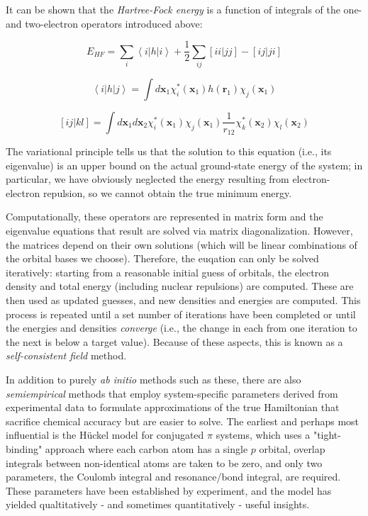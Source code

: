 \documentclass[12pt,letter,footinclude=true,headinclude=true,hyphens]{book} %
\begin{document}
    It can be shown that the \emph{Hartree-Fock energy} is a function of integrals of the one- and two-electron operators introduced above:
    
    \begin{equation}
    E_{HF} = \sum_i \left < i | h | i \right > + \frac{1}{2} \sum_{ij} \left [ ii | jj \right ] - \left [ ij | ji \right ]
    \end{equation}
    
    \begin{equation}
    \left < i | h | j \right > = \int d\mathbf{x}_1 \chi_i^* (\mathbf{x}_1)  h(\mathbf{r}_1) \chi_j (\mathbf{x}_1)
    \end{equation}
    
    \begin{equation}
    \left [ ij | kl \right ] = \int d\mathbf{x}_1 d\mathbf{x}_2 \chi_i^* (\mathbf{x}_1) \chi_j (\mathbf{x}_1) \frac{1}{r_{12}}  \chi_k^* (\mathbf{x}_2) \chi_l (\mathbf{x}_2)
    \end{equation}
    
    The variational principle tells us that the solution to this equation (i.e., its eigenvalue) is an upper bound on the actual ground-state energy of the system; in particular, we have obviously neglected the energy resulting from electron-electron repulsion, so we cannot obtain the true minimum energy.
    
    Computationally, these operators are represented in matrix form and the eigenvalue equations that result are solved via matrix diagonalization. However, the matrices depend on their own solutions (which will be linear combinations of the orbital bases we choose). Therefore, the euqation can only be solved iteratively: starting from a reasonable initial guess of orbitals, the electron density and total energy (including nuclear repulsions) are computed. These are then used as updated guesses, and new densities and energies are computed. This process is repeated until a set number of iterations have been completed or until the energies and densities \emph{converge} (i.e., the change in each from one iteration to the next is below a target value). Because of these aspects, this is known as a \emph{self-consistent field} method.
    
    In addition to purely \emph{ab initio} methods such as these, there are also \emph{semiempirical} methods that employ system-specific parameters derived from experimental data to formulate approximations of the true Hamiltonian that sacrifice chemical accuracy but are easier to solve. The earliest and perhaps most influential is the H\"{u}ckel model for conjugated $\pi$ systems, which uses a "tight-binding" approach where each carbon atom has a single $p$ orbital, overlap integrals between non-identical atoms are taken to be zero, and only two parameters, the Coulomb integral and resonance/bond integral, are required. These parameters have been established by experiment, and the model has yielded qualtitatively - and sometimes quantitatively - useful insights.
    
\end{document}

